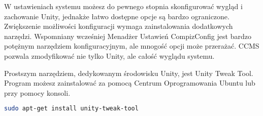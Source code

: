 W \textcolor{ubuntu_orange}{ustawieniach systemu} możesz do pewnego stopnia skonfigurować wygląd i zachowanie Unity, jednakże łatwo dostępne opcje są bardzo ograniczone. Zwiększenie możliwości konfiguracji wymaga zainstalowania dodatkowych narzędzi. Wspomniany wcześniej Menadżer Ustawień CompizConfig jest bardzo potężnym narzędziem konfiguracyjnym, ale mnogość opcji może przerażać. CCMS pozwala zmodyfikować nie tylko Unity, ale całość wyglądu systemu.

Prostszym narzędziem, dedykowanym środowisku Unity, jest \textcolor{ubuntu_orange}{Unity Tweak Tool}. Program możesz zainstalować za pomocą Centrum Oprogramowania Ubuntu lub przy pomocy konsoli.
\begin{lstlisting}[language=bash]
sudo apt-get install unity-tweak-tool
\end{lstlisting}
